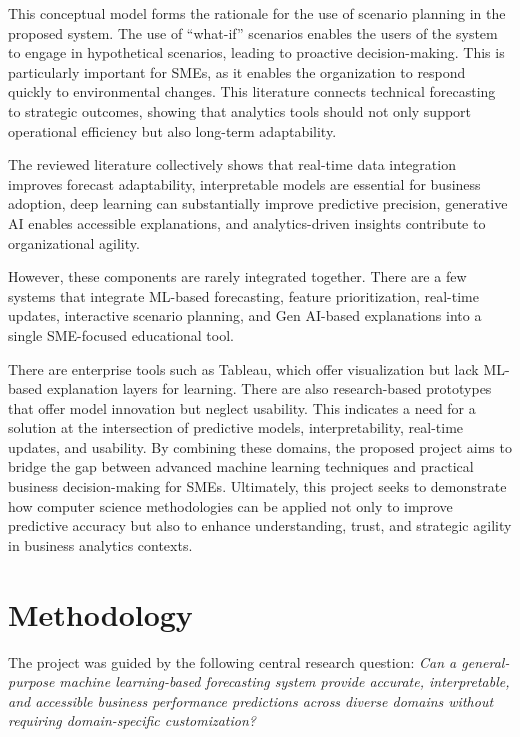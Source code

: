 \documentclass[12pt]{article}
\begin{document}
This conceptual model forms the rationale for the use of scenario planning in the proposed system. The use of “what-if” scenarios enables the users of the system to engage in hypothetical scenarios, leading to proactive decision-making. This is particularly important for SMEs, as it enables the organization to respond quickly to environmental changes. This literature connects technical forecasting to strategic outcomes, showing that analytics tools should not only support operational efficiency but also long-term adaptability.

The reviewed literature collectively shows that real-time data integration improves
forecast adaptability, interpretable models are essential for business adoption, deep learning
can substantially improve predictive precision, generative AI enables accessible explanations,
and analytics-driven insights contribute to organizational agility.

However, these components are rarely integrated together. There are a few systems that integrate ML-based forecasting, feature prioritization, real-time updates, interactive scenario planning, and Gen AI-based explanations into a single SME-focused educational tool.

There are enterprise tools such as Tableau, which offer visualization but lack ML-based explanation layers for learning. There are also research-based prototypes that offer model innovation but neglect usability. This indicates a need for a solution at the intersection of predictive models, interpretability, real-time updates, and usability. By combining these domains, the proposed project aims to bridge the gap between advanced machine learning techniques and practical business decision-making for SMEs. Ultimately, this project seeks to demonstrate how computer science methodologies can be applied not only to improve predictive accuracy but also to enhance understanding, trust, and strategic agility in business analytics contexts.


\section{Methodology}


The project was guided by the following central research question:
\textit{Can a general-purpose machine learning-based forecasting system provide accurate, interpretable, and accessible business performance predictions across diverse domains without requiring domain-specific customization?}
\end{document}
